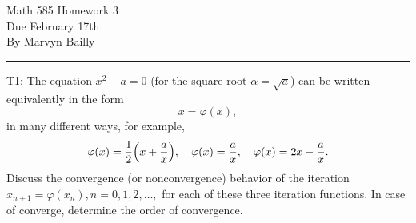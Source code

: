 \documentclass[12pt]{report}
\begin{document}
\large

\begin{center}
 Math 585 Homework 3\\
 Due February 17th\\
 By Marvyn Bailly\\
\end{center}

\normalsize

\hrule





\begin{problem}
    T1: The equation $x^2 - a = 0$ (for the square root $\alpha = \sqrt{a}$) can be written equivalently in the form
    \[ 
        x = \varphi(x),
    \]
    in many different ways, for example,
    \[
        \varphi(x) = \frac{1}{2}{\left(x + \frac{a}{x}\right)}, ~~~ \varphi(x) = \frac{a}{x}, ~~~ \varphi(x) = 2x - \frac{a}{x}.
    \]
    Discuss the convergence (or nonconvergence) behavior of the iteration $x_{n+1} = \varphi(x_n), n = 0,1,2,\dots,$ for each of these three iteration functions. In case of converge, determine the order of convergence.  
\end{problem}
\end{document}

